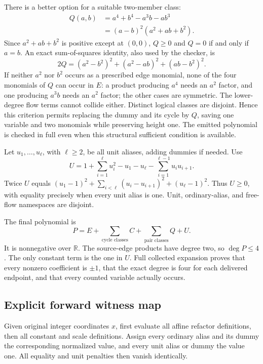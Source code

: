 There is a better option for a suitable two-member class:
\begin{align*}
 Q(a,b)&=a^4+b^4-a^3b-ab^3\\
       &=(a-b)^2(a^2+ab+b^2).
\end{align*}
Since \(a^2+ab+b^2\) is positive except at \((0,0)\),
\(Q\geq0\) and \(Q=0\) if and only if \(a=b\). An exact
sum-of-squares identity, also used by the checker, is
\[
 2Q=(a^2-b^2)^2+(a^2-ab)^2+(ab-b^2)^2.
\]
If neither \(a^2\) nor \(b^2\) occurs as a prescribed edge monomial,
none of the four monomials of \(Q\) can occur in \(E\): a product
producing \(a^4\) needs an \(a^2\) factor, and one producing
\(a^3b\) needs an \(a^2\) factor; the other cases are symmetric.
The lower-degree flow terms cannot collide either. Distinct logical
classes are disjoint. Hence this criterion permits replacing the dummy
and its cycle by \(Q\), saving one variable and two monomials while
preserving height one. The emitted polynomial is checked in full even
when this structural sufficient condition is available.

Let \(u_1,\ldots,u_\ell\), with \(\ell\geq2\), be all unit aliases,
adding dummies if needed. Use
\[
 U=1+\sum_{i=1}^{\ell}u_i^2-u_1-u_\ell-
                      \sum_{i=1}^{\ell-1}u_iu_{i+1}.
\]
Twice \(U\) equals
\((u_1-1)^2+\sum_{i<\ell}(u_i-u_{i+1})^2+(u_\ell-1)^2\).
Thus \(U\geq0\), with equality precisely when every unit alias is one.
Unit, ordinary-alias, and free-flow namespaces are disjoint.

The final polynomial is
\[
 \boxed{\displaystyle P=E+\sum_{\text{cycle classes}}C+
                         \sum_{\text{pair classes}}Q+U.}
\]
It is nonnegative over \(\mathbb R\). The source-edge products have
degree two, so \(\deg P\leq4\). The only constant term is the one
in \(U\). Full collected expansion proves that every nonzero coefficient
is \(\pm1\), that the exact degree is four for each delivered endpoint,
and that every counted variable actually occurs.

\subsection{Explicit forward witness map}
Given original integer coordinates \(x\), first evaluate all affine
refactor definitions, then all constant and scale definitions. Assign
every ordinary alias and its dummy the corresponding normalized value,
and every unit alias or dummy the value one. All equality and unit
penalties then vanish identically.

